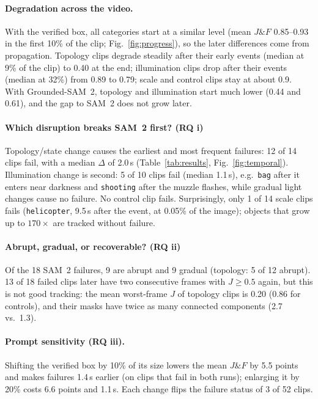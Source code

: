 \documentclass[11pt,a4paper]{article}
\newcommand{\sam}{SAM~2}
\newcommand{\gdsam}{Grounded-SAM~2}
\begin{document}
\paragraph{Degradation across the video.}
With the verified box, all categories start at a similar level (mean $J\&F$
0.85--0.93 in the first 10\% of the clip; Fig.~\ref{fig:progress}), so the
later differences come from propagation. Topology clips degrade steadily after
their early events (median at 9\% of the clip) to 0.40 at the end;
illumination clips drop after their events (median at 32\%) from 0.89 to
0.79; scale and control clips stay at about 0.9. With \gdsam{}, topology and
illumination start much lower (0.44 and 0.61), and the gap to \sam{} does not
grow later.

\paragraph{Which disruption breaks \sam{} first? (RQ i)}
Topology/state change causes the earliest and most frequent failures: 12 of
14 clips fail, with a median $\Delta$ of 2.0\,s (Table~\ref{tab:results},
Fig.~\ref{fig:temporal}). Illumination change is second: 5 of 10 clips fail
(median 1.1\,s), e.g.\ \texttt{bag} after it enters near darkness and
\texttt{shooting} after the muzzle flashes, while gradual light changes cause
no failure. No control clip fails. Surprisingly, only 1 of 14 scale clips
fails (\texttt{helicopter}, 9.5\,s after the event, at 0.05\% of the image);
objects that grow up to $170\times$ are tracked without failure.

\paragraph{Abrupt, gradual, or recoverable? (RQ ii)}
Of the 18 \sam{} failures, 9 are abrupt and 9 gradual (topology: 5 of 12
abrupt). 13 of 18 failed clips later have two consecutive frames with
$J\ge0.5$ again, but this is not good tracking: the mean worst-frame $J$ of
topology clips is 0.20 (0.86 for controls), and their masks have twice as
many connected components (2.7 vs.\ 1.3).

\paragraph{Prompt sensitivity (RQ iii).}
Shifting the verified box by 10\% of its size lowers the mean $J\&F$ by 5.5
points and makes failures 1.4\,s earlier (on clips that fail in both runs);
enlarging it by 20\% costs 6.6 points and 1.1\,s. Each change flips the
failure status of 3 of 52 clips.
\end{document}
